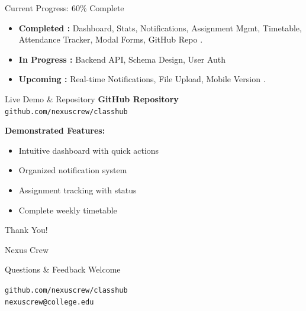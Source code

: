 \documentclass{beamer}
\begin{document}
\begin{frame}{Current Progress: 60\% Complete }
    \begin{itemize}
        \item \textbf{Completed :} Dashboard, Stats, Notifications, Assignment Mgmt, Timetable, Attendance Tracker, Modal Forms, GitHub Repo .
        \item \textbf{In Progress :} Backend API, Schema Design, User Auth 
        \item \textbf{Upcoming :} Real-time Notifications, File Upload, Mobile Version .
    \end{itemize}
\end{frame}

\begin{frame}{Live Demo \& Repository }
    \centering
    \Large \textbf{GitHub Repository } \\
    \texttt{github.com/nexuscrew/classhub} 
    
    \vspace{0.5cm}
    \flushleft \normalsize \textbf{Demonstrated Features:}
    \begin{itemize}
        \item Intuitive dashboard with quick actions 
        \item Organized notification system 
        \item Assignment tracking with status 
        \item Complete weekly timetable 
    \end{itemize}
\end{frame}

\begin{frame}
    \centering
    \Huge Thank You! 
    
    \vspace{1cm}
    \Large Nexus Crew 
    
    \normalsize
    Questions \& Feedback Welcome 
    
    \vspace{0.5cm}
    \texttt{github.com/nexuscrew/classhub} \\
    \texttt{nexuscrew@college.edu} 
\end{frame}
\end{document}
